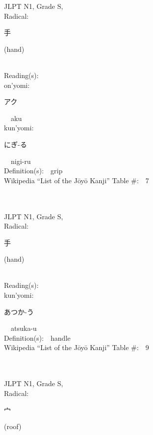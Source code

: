 \begin{multicols}{2}
{JLPT N1, Grade S, \\Radical:\ \ {\begin{CJK}{UTF8}{min} 手 \end{CJK}} (hand) } \\
Reading(s):\ \ \\
{\hspace*{1em}}on'yomi:\ \ \\
{\hspace*{2em}}{\begin{CJK}{UTF8}{min} アク \end{CJK}}\ \ aku\ \ \\
{\hspace*{1em}}kun'yomi:\ \ \\
{\hspace*{2em}}{\begin{CJK}{UTF8}{min} にぎ-る \end{CJK}}\ \ nigi-ru\ \ \\
Definition(s):\ \ grip \\
Wikipedia ``List of the J\=oy\=o Kanji'' Table \#:\ \      7 \\
\ \ \\
{\fontsize{34pt}{40pt}  }\ \ \\
{JLPT N1, Grade S, \\Radical:\ \ {\begin{CJK}{UTF8}{min} 手 \end{CJK}} (hand) } \\
Reading(s):\ \ \\
{\hspace*{1em}}kun'yomi:\ \ \\
{\hspace*{2em}}{\begin{CJK}{UTF8}{min} あつか-う \end{CJK}}\ \ atsuka-u\ \ \\
Definition(s):\ \ handle \\
Wikipedia ``List of the J\=oy\=o Kanji'' Table \#:\ \      9 \\
\ \ \\
{\fontsize{34pt}{40pt}  }\ \ \\
{JLPT N1, Grade S, \\Radical:\ \ {\begin{CJK}{UTF8}{min} 宀 \end{CJK}} (roof) } \\

\end{multicols}
